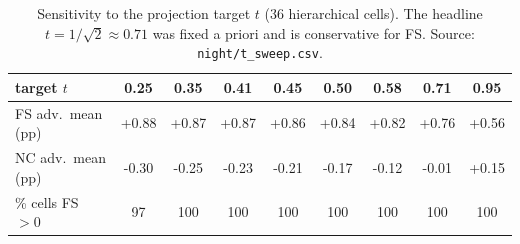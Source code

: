 \begin{table}[H]
\centering
\small
\begin{tabular}{lcccccccc}
\toprule
target $t$ & 0.25 & 0.35 & 0.41 & 0.45 & 0.50 & 0.58 & 0.71 & 0.95 \\
\midrule
FS adv.\ mean (pp) & +0.88 & +0.87 & +0.87 & +0.86 & +0.84 & +0.82 & +0.76 & +0.56 \\
NC adv.\ mean (pp) & -0.30 & -0.25 & -0.23 & -0.21 & -0.17 & -0.12 & -0.01 & +0.15 \\
\% cells FS $>0$ & 97 & 100 & 100 & 100 & 100 & 100 & 100 & 100 \\
\bottomrule
\end{tabular}
\caption{Sensitivity to the projection target $t$ (36 hierarchical cells). The headline $t=1/\sqrt2\approx0.71$ was fixed a priori and is conservative for FS. Source: \texttt{night/t\_sweep.csv}.}
\label{tab:b4-tsweep}
\end{table}
